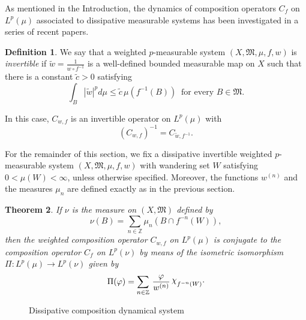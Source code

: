 \documentclass[12pt]{article}
\theoremstyle{plain}
\newtheorem{theorem}{Theorem}%
\theoremstyle{definition}
\newtheorem{definition}[theorem]{Definition}%
\newcommand{\Z}{\mathbb{Z}} %
\newcommand{\fM}{\mathfrak{M}}
\newcommand{\wt}{\widetilde}
\DeclareRobustCommand{\rchi}{{\mathpalette\irchi\relax}}
\newcommand{\irchi}[2]{\raisebox{\depth}{$#1\chi$}}
\begin{document}
\medskip
As mentioned in the Introduction, the dynamics of composition operators $C_f$ on $L^p(\mu)$ associated to
dissipative measurable systems has been investigated in a series of recent papers.

\begin{definition}\label{Dis-D2}
We say that a weighted $p$-measurable system $(X,\fM,\mu,f,w)$ is {\em invertible} if 
$\wt{w} = \frac{1}{w \circ f^{-1}}$ is a well-defined bounded measurable map on $X$ such that there is a constant $\tilde{c} > 0$ satisfying
\[
\int_B |\wt{w}|^p d\mu \leq \tilde{c}\, \mu(f^{-1}(B)) \ \text{ for every } B \in \fM.
\]
\end{definition}

In this case, $C_{w,f}$ is an invertible operator on $L^p(\mu)$ with 
\[
(C_{w,f})^{-1} = C_{\wt{w},f^{-1}}.
\]

For the remainder of this section, we fix a dissipative invertible weighted $p$-measurable system $(X,\fM,\mu,f,w)$
with wandering set $W$ satisfying $0 < \mu(W) < \infty$, unless otherwise specified.
Moreover, the functions $w^{(n)}$ and the measures $\mu_n$ are defined exactly as in the previous section.

\begin{theorem}\label{Dis-T1}
If $\nu$ is the measure on $(X,\fM)$ defined by 
\begin{equation}\label{Dis-Eq1}
\nu(B) = \sum_{n \in \Z} \mu_n(B \cap f^{-n}(W)),
\end{equation}
then the weighted composition operator $C_{w,f}$ on $L^p(\mu)$ is conjugate to the composition operator $C_f$ on $L^p(\nu)$
by means of the isometric isomorphism $\Pi : L^p(\mu) \to L^p(\nu)$ given by
\begin{equation}\label{Dis-Eq2}
\Pi(\varphi) =\sum_{n \in \Z}\, \frac{\varphi}{w^{(n)}}\, \rchi_{f^{-n}(W)}\cdot
\end{equation}
\end{theorem}

\begin{figure}[h]
\centering
\caption{Dissipative composition dynamical system }
\end{figure}
\end{document}
